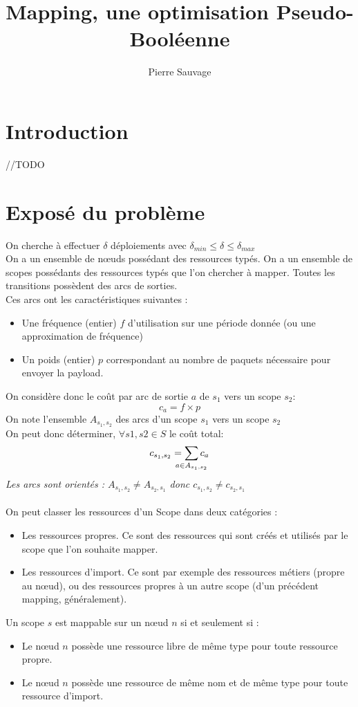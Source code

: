 \documentclass[11pt,a4paper]{article} %
\title{Mapping, une optimisation Pseudo-Booléenne}
\author{Pierre Sauvage}
\begin{document}
\maketitle
\section{Introduction}
//TODO
\section{Exposé du problème}

On cherche à effectuer $ \delta $ déploiements avec  $ \delta_{min} \leq \delta \leq \delta_{max} $\\
On a un ensemble de nœuds possédant des ressources typés. On a un ensemble de scopes possédants des ressources typés que l'on chercher à mapper.
Toutes les transitions possèdent des arcs de sorties.\\
Ces arcs ont les caractéristiques suivantes :
\begin{itemize}
\item Une fréquence (entier) $f$ d'utilisation sur une période donnée (ou une approximation de fréquence)
\item Un poids (entier) $p$ correspondant au nombre de paquets nécessaire pour envoyer la payload.
\end{itemize}
On considère donc le coût par arc de sortie $a$ de $s_1$ vers un scope $s_2$:
\[
	{c_a} = f \times p
\]
On note l'ensemble $A_{s_1,s_2}$ des arcs d'un scope $s_1$ vers un scope $s_2$\\
On peut donc déterminer, $\forall s1,s2 \in S$ le coût total:
\[
c_{s_1,s_2} = \smashoperator{\sum_{a \in A_{s_1,s_2}}}{c_a}
\]
\textit{Les arcs sont orientés : $A_{s_1,s_2} \neq A_{s_2,s_1}$ donc $c_{s_1,s_2} \neq c_{s_2,s_1}$}\\\\
On peut classer les ressources d'un Scope dans deux catégories :
\begin{itemize}
\item Les ressources propres. Ce sont des ressources qui sont créés et utilisés par le scope que l'on souhaite mapper.
\item Les ressources d'import. Ce sont par exemple des ressources métiers (propre au nœud), ou des ressources propres à un autre scope (d'un précédent mapping, généralement).
\end{itemize}
Un scope $s$ est mappable sur un nœud $n$ si et seulement si :
\begin{itemize}
\item Le nœud $n$ possède une ressource libre de même type pour toute ressource propre.
\item Le nœud $n$ possède une ressource de même nom et de même type pour toute ressource d'import.
\end{itemize}
\end{document}
